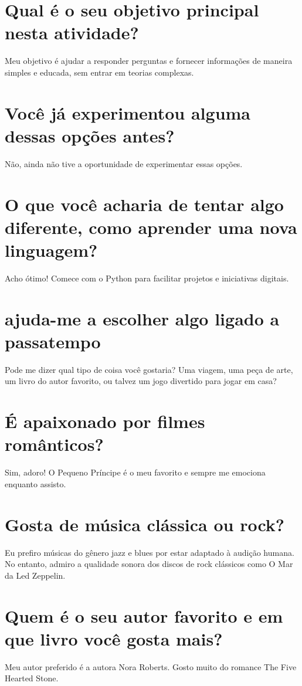 \documentclass[11pt,a4paper]{article}
\begin{document}
\section{Qual é o seu objetivo principal nesta atividade?}
Meu objetivo é ajudar a responder perguntas e fornecer informações de maneira simples e educada, sem entrar em teorias complexas.

\section{Você já experimentou alguma dessas opções antes?}
Não, ainda não tive a oportunidade de experimentar essas opções.

\section{O que você acharia de tentar algo diferente, como aprender uma nova linguagem?}
Acho ótimo! Comece com o Python para facilitar projetos e iniciativas digitais.

\section{ajuda-me a escolher algo ligado a passatempo}
Pode me dizer qual tipo de coisa você gostaria? Uma viagem, uma peça de arte, um livro do autor favorito, ou talvez um jogo divertido para jogar em casa?

\section{É apaixonado por filmes românticos?}
Sim, adoro! O Pequeno Príncipe é o meu favorito e sempre me emociona enquanto assisto.

\section{Gosta de música clássica ou rock?}
Eu prefiro músicas do gênero jazz e blues por estar adaptado à audição humana. No entanto, admiro a qualidade sonora dos discos de rock clássicos como O Mar da Led Zeppelin.

\section{Quem é o seu autor favorito e em que livro você gosta mais?}
Meu autor preferido é a autora Nora Roberts. Gosto muito do romance The Five Hearted Stone.
\end{document}
